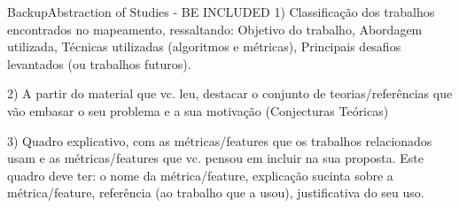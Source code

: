 \documentclass[aspectratio=169,10pt,xcolor={dvipsnames}]{beamer}
\begin{document}
\begin{frame}{Backup}{Abstraction of Studies} - BE INCLUDED
    1) Classificação dos trabalhos encontrados no mapeamento, ressaltando: Objetivo do trabalho, Abordagem utilizada, Técnicas utilizadas (algoritmos e métricas), Principais desafios levantados (ou trabalhos futuros). 
    
  
    2) A partir do material que vc. leu, destacar o conjunto de teorias/referências que vão embasar o seu problema e a sua motivação (Conjecturas Teóricas)
    
    
    3) Quadro explicativo, com as métricas/features que os trabalhos relacionados usam e as métricas/features que vc. pensou em incluir na sua proposta. Este quadro deve ter: o nome da métrica/feature, explicação sucinta sobre a métrica/feature, referência (ao trabalho que a usou), justificativa do seu uso. 
    
  \end{frame}





     
\end{document}
